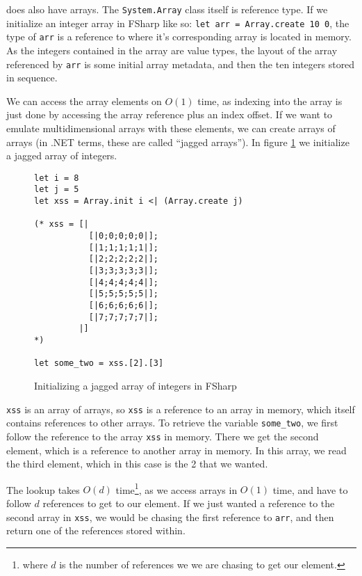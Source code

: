 \fsharp{} does also have arrays. The \texttt{System.Array} class itself is reference
type. If we initialize an integer array in FSharp like so: \texttt{let arr =
Array.create 10 0}, the type of \texttt{arr} is a reference to where it's corresponding
array is located in memory. As the integers contained in the array are value
types, the layout of the array referenced by \texttt{arr} is some initial array
metadata, and then the ten integers stored in sequence.

We can access the array elements on $O(1)$ time, as indexing into the array is
just done by accessing the array reference plus an index offset.
If we want to emulate multidimensional arrays with these elements, we can create
arrays of arrays (in .NET terms, these are called ``jagged arrays''). In figure
\ref{fig:jaggedarrayfsharp} we initialize a jagged array of integers.

\begin{figure}[h]
  \centering
\begin{verbatim}
let i = 8
let j = 5
let xss = Array.init i <| (Array.create j) 
  
(* xss = [|
           [|0;0;0;0;0|];
           [|1;1;1;1;1|];
           [|2;2;2;2;2|];
           [|3;3;3;3;3|];
           [|4;4;4;4;4|];
           [|5;5;5;5;5|];
           [|6;6;6;6;6|];
           [|7;7;7;7;7|];
         |]
*) 

let some_two = xss.[2].[3]

\end{verbatim}
  \caption{Initializing a jagged array of integers in FSharp}
  \label{fig:jaggedarrayfsharp}
\end{figure}

\texttt{xss} is an array of arrays, so \texttt{xss} is a reference to an array
in memory, which itself contains references to other arrays.
To retrieve the variable \texttt{some\_two}, we first follow the reference to
the array \texttt{xss} in memory. There we get the second element, which is a
reference to another array in memory. In this array, we read the third element,
which in this case is the 2 that we wanted.

The lookup takes $O(d)$ time\footnote{where $d$ is the number of references we
  we are chasing to get our element.}, as we access arrays in $O(1)$ time, and have to follow $d$
references to get to our element. If we just wanted a reference to the second
array in \texttt{xss}, we would be chasing the first reference to \texttt{arr},
and then return one of the references stored within.

